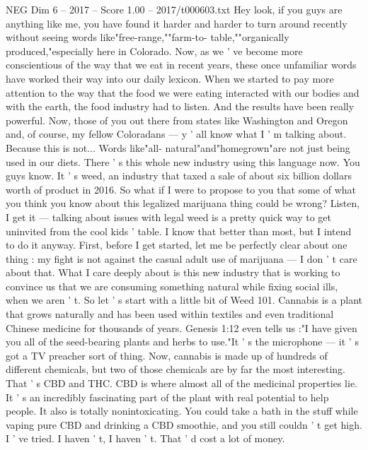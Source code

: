 \begin{textsample}{NEG Dim 6 – 2017 – Score 1.00 – 2017/t000603.txt}  \label{ex:f6_neg_020}
Hey look, if you guys are anything like me, you have found it harder and harder to turn around recently without seeing words like"free-range,""farm-to- table,""organically produced,"especially here in Colorado.
Now, as we ' ve become more conscientious of the way that we eat in recent years, these once unfamiliar words have worked their way into our daily lexicon.
When we started to pay more attention to the way that the food we were eating interacted with our bodies and with the earth, the food industry had to listen.
And the results have been really powerful.
Now, those of you out there from states like Washington and Oregon and, of course, my fellow Coloradans — y ' all know what I ' m talking about.
Because this is not...
Words like"all- natural"and"homegrown"are not just being used in our diets.
There ' s this whole new industry using this language now.
You guys know.
It ' s weed, an industry that taxed a sale of about six billion dollars worth of product in 2016.
So what if I were to propose to you that some of what you think you know about this legalized marijuana thing could be wrong?
Listen, I get it — talking about issues with legal weed is a pretty quick way to get uninvited from the cool kids ' table.
I know that better than most, but I intend to do it anyway.
First, before I get started, let me be perfectly clear about one thing : my fight is not against the casual adult use of marijuana — I don ' t care about that.
What I care deeply about is this new industry that is working to convince us that we are consuming something natural while fixing social ills, when we aren ' t.
So let ' s start with a little bit of Weed 101.
Cannabis is a plant that grows naturally and has been used within textiles and even traditional Chinese medicine for thousands of years.
Genesis 1:12 even tells us :"I have given you all of the seed-bearing plants and herbs to use."It ' s the microphone — it ' s got a TV preacher sort of thing.
Now, cannabis is made up of hundreds of different chemicals, but two of those chemicals are by far the most interesting.
That ' s CBD and THC.
CBD is where almost all of the medicinal properties lie.
It ' s an incredibly fascinating part of the plant with real potential to help people.
It also is totally nonintoxicating.
You could take a bath in the stuff while vaping pure CBD and drinking a CBD smoothie, and you still couldn ' t get high.
I ' ve tried.
I haven ' t, I haven ' t.
That ' d cost a lot of money.

\end{textsample}
